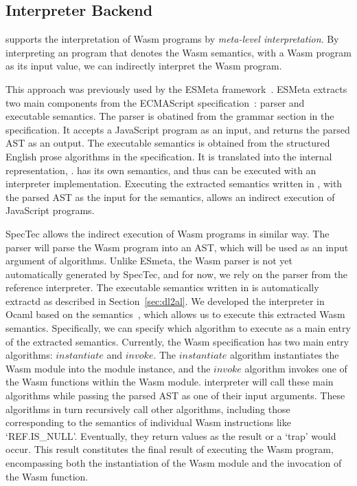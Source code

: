 \subsection{Interpreter Backend}\label{sec:interp} %
\dslname supports the interpretation of Wasm programs by \textit{meta-level interpretation}.
By interpreting an \al program that denotes the Wasm semantics, with
a Wasm program as its input value, we can indirectly interpret the Wasm program.

This approach was previously used by the ESMeta framework~\cite{esmeta,jiset}.
ESMeta extracts two main components from the ECMAScript specification~\cite{ecmascript}:
parser and executable semantics.
The parser is obatined from the grammar section in the specification.
It accepts a JavaScript program as an input, and returns the parsed AST as an output.
The executable semantics is obtained from the structured English prose algorithms in the specification.
It is translated into the internal representation, \ires.
\ires has its own semantics, and thus can be executed with an interpreter implementation.
Executing the extracted semantics written in \ires, with the parsed AST as the input for the semantics,
allows an indirect execution of JavaScript programs.

SpecTec allows the indirect execution of Wasm programs in similar way.
The parser will parse the Wasm program into an AST, which will be used as an input argument of \al algorithms.
Unlike ESmeta, the Wasm parser is not yet automatically generated by SpecTec,
and for now, we rely on the parser from the reference interpreter.
The executable semantics written in \al is automatically extractd as described in Section~\ref{sec:dl2al}.
We developed the \al interpreter in Ocaml based on the \al semantics~\cite{il-tr},
which allows us to execute this extracted Wasm semantics.
Specifically, we can specify which \al algorithm to execute as a main entry of the extracted semantics.
Currently, the Wasm specification has two main entry algorithms:
$\mathit{instantiate}$ and $\mathit{invoke}$. 
The $\mathit{instantiate}$ algorithm instantiates the Wasm module into the module instance,
and the $\mathit{invoke}$ algorithm invokes one of the Wasm functions within the Wasm module.
\al interpreter will call these main algorithms while passing the parsed AST as one of their input arguments.
These algorithms in turn recursively call other algorithms,
including those corresponding to the semantics of individual Wasm instructions like `REF.IS\_NULL'.
Eventually, they return \al values as the result or a `trap' would occur.
This result constitutes the final result of executing the Wasm program,
encompassing both the instantiation of the Wasm module and the invocation of the Wasm function.



